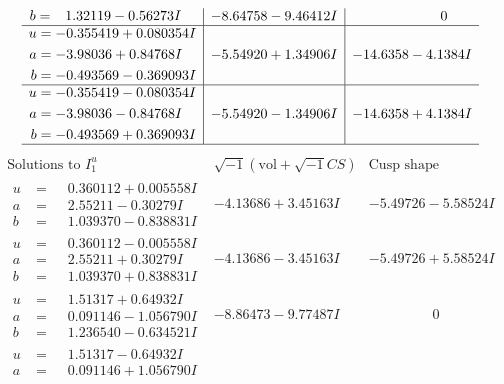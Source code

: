 \documentclass[1p]{elsarticle_modified}
\theoremstyle{definition}
\newcommand{\I}{\sqrt{-1}}
\begin{document}
$$\begin{array}{c|c|c}
\begin{aligned}
b &= \phantom{-}1.32119 - 0.56273 I\end{aligned}
 & -8.64758 - 9.46412 I & \phantom{-0.000000 } 0 \\ \hline\begin{aligned}
u &= -0.355419 + 0.080354 I \\
a &= -3.98036 + 0.84768 I \\
b &= -0.493569 - 0.369093 I\end{aligned}
 & -5.54920 + 1.34906 I & -14.6358 - 4.1384 I \\ \hline\begin{aligned}
u &= -0.355419 - 0.080354 I \\
a &= -3.98036 - 0.84768 I \\
b &= -0.493569 + 0.369093 I\end{aligned}
 & -5.54920 - 1.34906 I & -14.6358 + 4.1384 I\\
 \hline 
 \end{array}$$\newpage$$\begin{array}{c|c|c}  
\text{Solutions to }I^u_{1}& \I (\text{vol} + \sqrt{-1}CS) & \text{Cusp shape}\\
 \hline 
\begin{aligned}
u &= \phantom{-}0.360112 + 0.005558 I \\
a &= \phantom{-}2.55211 - 0.30279 I \\
b &= \phantom{-}1.039370 - 0.838831 I\end{aligned}
 & -4.13686 + 3.45163 I & -5.49726 - 5.58524 I \\ \hline\begin{aligned}
u &= \phantom{-}0.360112 - 0.005558 I \\
a &= \phantom{-}2.55211 + 0.30279 I \\
b &= \phantom{-}1.039370 + 0.838831 I\end{aligned}
 & -4.13686 - 3.45163 I & -5.49726 + 5.58524 I \\ \hline\begin{aligned}
u &= \phantom{-}1.51317 + 0.64932 I \\
a &= \phantom{-}0.091146 - 1.056790 I \\
b &= \phantom{-}1.236540 - 0.634521 I\end{aligned}
 & -8.86473 - 9.77487 I & \phantom{-0.000000 } 0 \\ \hline\begin{aligned}
u &= \phantom{-}1.51317 - 0.64932 I \\
a &= \phantom{-}0.091146 + 1.056790 I \\

\end{aligned}
\end{array}$$
\end{document}
